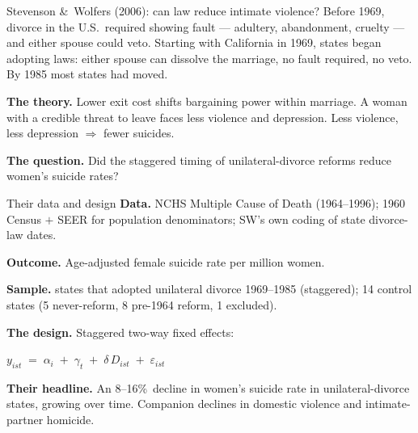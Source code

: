 \documentclass[aspectratio=169,11pt]{beamer}
\begin{document}
\begin{frame}{Stevenson \&\ Wolfers (2006): can law reduce intimate violence?}
\vspace{0.4em}
Before 1969, divorce in the U.S.\ required showing fault --- adultery, abandonment, cruelty --- and either spouse could veto. \;Starting with California in 1969, states began adopting  laws: either spouse can dissolve the marriage, no fault required, no veto. \;By 1985 most states had moved.

\vspace{0.6em}
\textbf{The theory.} \;Lower exit cost shifts bargaining power within marriage. \;A woman with a credible threat to leave faces less violence and depression. \;Less violence, less depression $\Rightarrow$ fewer suicides.

\vspace{0.6em}
\textbf{The question.} \;Did the staggered timing of unilateral-divorce reforms reduce women's suicide rates?

\vspace{0.4em}
\end{frame}

\begin{frame}{Their data and design}
\vspace{0.5em}
\textbf{Data.} \;NCHS Multiple Cause of Death (1964--1996); 1960 Census $+$ SEER for population denominators; SW's own coding of state divorce-law dates.

\vspace{0.4em}
\textbf{Outcome.} \;Age-adjusted female suicide rate per million women.

\vspace{0.4em}
\textbf{Sample.}  states that adopted unilateral divorce 1969--1985 (staggered); 14 control states (5 never-reform, 8 pre-1964 reform, 1 excluded).

\vspace{0.6em}
\textbf{The design.} \;Staggered two-way fixed effects:
\begin{center}\small
$y_{ist} \;=\; \alpha_i \;+\; \gamma_t \;+\; \delta\, D_{ist} \;+\; \varepsilon_{ist}$
\end{center}

\vspace{0.4em}
\textbf{Their headline.} \;An 8--16\%\ decline in women's suicide rate in unilateral-divorce states, growing over time. \;Companion declines in domestic violence and intimate-partner homicide.
\end{frame}
\end{document}
